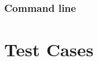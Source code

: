 \documentclass[12pt,a4paper]{article}
\begin{document}
\subsubsection{Command line}

\subsubsection{}

\subsubsection{}

\subsection{}

\section{Test Cases}


\end{document}
